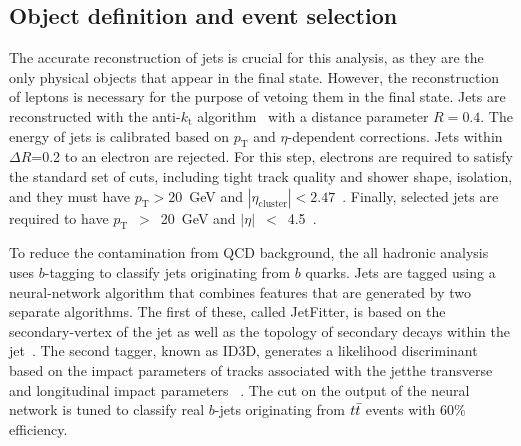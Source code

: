 \def \pt {p_{\mathrm{T}}}

\subsection{Object definition and event selection}
\label{sec:obj}


The accurate reconstruction of jets is crucial for this analysis,
as they are the only physical objects that appear in the final state.
However, the reconstruction of leptons is necessary for the purpose 
of vetoing them in the final state.
Jets are reconstructed with the anti-$k_{\mathrm{t}}$ algorithm~\cite{Cacciari200657,Cacciari:2008gp} with a distance parameter $R=0.4$. %
The energy of jets is calibrated based on $\pt$ and $\eta$-dependent corrections.
Jets within $\Delta R$=0.2 to an electron are rejected.
For this step, electrons are required to satisfy the standard set of cuts, including tight track quality and shower shape, isolation, and they must have $p_{\mathrm{T}}>20$~GeV and $|\eta_{\mathrm{cluster}}|<2.47$~\cite{ATLAS-CONF-2011-100}.
Finally, selected jets are required to have $\pt$~$>$~20~GeV and $|\eta|$~$<$~4.5~\cite{ref:jets,ref:jessys}.



To reduce the contamination from QCD background, the all hadronic analysis uses $b$-tagging to classify jets originating from $b$ quarks.
Jets are tagged using a neural-network algorithm that combines features that are generated by two separate algorithms.
The first of these, called JetFitter, is based on the secondary-vertex of the jet as well as the topology of secondary decays within the jet~\cite{ATLAS-CONF-2011-102}.
The second tagger, known as ID3D, generates a likelihood discriminant based on the impact parameters of tracks associated with the jetthe transverse and longitudinal impact parameters ~\cite{ATLAS-CONF-2011-102}.
The cut on the output of the neural network is tuned to classify real $b$-jets originating from $t\bar{t}$ events with 60\% efficiency.

